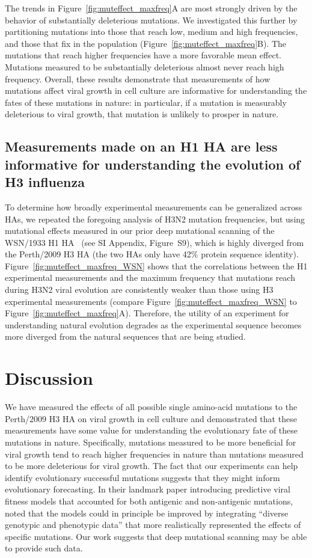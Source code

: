 The trends in Figure~\ref{fig:muteffect_maxfreq}A are most strongly driven by the behavior of substantially deleterious mutations.
We investigated this further by partitioning mutations into those that reach low, medium and high frequencies, and those that fix in the population (Figure~\ref{fig:muteffect_maxfreq}B).
The mutations that reach higher frequencies have a more favorable mean effect.
Mutations measured to be substantially deleterious almost never reach high frequency.
Overall, these results demonstrate that measurements of how mutations affect viral growth in cell culture are informative for understanding the fates of these mutations in nature: in particular, if a mutation is measurably deleterious to viral growth, that mutation is unlikely to prosper in nature.

\subsection{Measurements made on an H1 HA are less informative for understanding the evolution of H3 influenza}
To determine how broadly experimental measurements can be generalized across HAs, we repeated the foregoing analysis of H3N2 mutation frequencies, but using mutational effects measured in our prior deep mutational scanning of the WSN/1933 H1 HA~\citep{Doud:2016gm} (see SI Appendix, Figure~S9), which is highly diverged from the Perth/2009 H3 HA (the two HAs only have 42\% protein sequence identity).
Figure~\ref{fig:muteffect_maxfreq_WSN} shows that the correlations between the H1 experimental measurements and the maximum frequency that mutations reach during H3N2 viral evolution are consistently weaker than those using H3 experimental measurements (compare Figure~\ref{fig:muteffect_maxfreq_WSN} to Figure~\ref{fig:muteffect_maxfreq}A).
Therefore, the utility of an experiment for understanding natural evolution degrades as the experimental sequence becomes more diverged from the natural sequences that are being studied.

\section{Discussion}
\label{sec:discussion}

We have measured the effects of all possible single amino-acid mutations to the Perth/2009 H3 HA on viral growth in cell culture and demonstrated that these measurements have some value for understanding the evolutionary fate of these mutations in nature.
Specifically, mutations measured to be more beneficial for viral growth tend to reach higher frequencies in nature than mutations measured to be more deleterious for viral growth.
The fact that our experiments can help identify evolutionary successful mutations suggests that they might inform evolutionary forecasting.
In their landmark paper introducing predictive viral fitness models that accounted for both antigenic and non-antigenic mutations, \citet{Luksza:2014hj} noted that the models could in principle be improved by integrating ``diverse genotypic and phenotypic data'' that more realistically represented the effects of specific mutations.
Our work suggests that deep mutational scanning may be able to provide such data.

